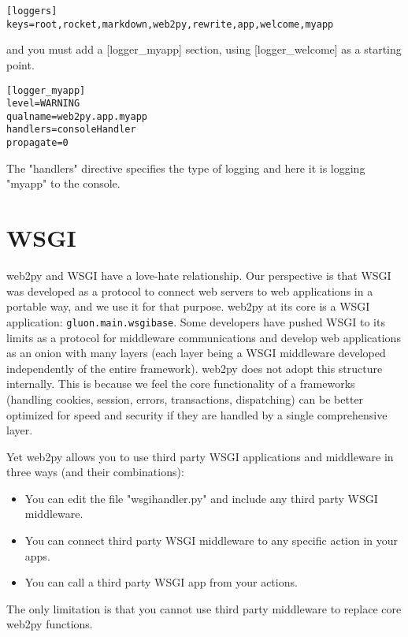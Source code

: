 \documentclass[justified,sixbynine,notoc]{tufte-book}
\def\ft{\small\tt}
\def\inxx#1{\index{#1}}
\begin{document}
\begin{fullwidth}
\begin{lstlisting}
[loggers]
keys=root,rocket,markdown,web2py,rewrite,app,welcome,myapp
\end{lstlisting}
\noindent and you must add a [logger\_myapp] section, using [logger\_welcome] as a starting point.

\begin{lstlisting}
[logger_myapp]
level=WARNING
qualname=web2py.app.myapp
handlers=consoleHandler
propagate=0
\end{lstlisting}

The "handlers" directive specifies the type of logging and here it is logging "myapp" to the console.

\goodbreak\section{WSGI}

\inxx{WSGI}
\noindent web2py and WSGI have a love-hate relationship. Our perspective is that WSGI was developed as a protocol to connect web servers to web applications in a portable way, and we use it for that purpose. web2py at its core is a WSGI application: {\ft gluon.main.wsgibase}. Some developers have pushed WSGI to its limits as a protocol for middleware communications and develop web applications as an onion with many layers (each layer being a WSGI middleware developed independently of the entire framework). web2py does not adopt this structure internally. This is because we feel the core functionality of a frameworks (handling cookies, session, errors, transactions, dispatching) can be better optimized for speed and security if they are handled by a single comprehensive layer.

Yet web2py allows you to use third party WSGI applications and middleware in three ways (and their combinations):
\begin{itemize}
\item You can edit the file "wsgihandler.py" and include any third party WSGI middleware.

\item You can connect third party WSGI middleware to any specific action in your apps.

\item You can call a third party WSGI app from your actions.
\end{itemize}

The only limitation is that you cannot use third party middleware to replace core web2py functions.


\end{fullwidth}
\end{document}
